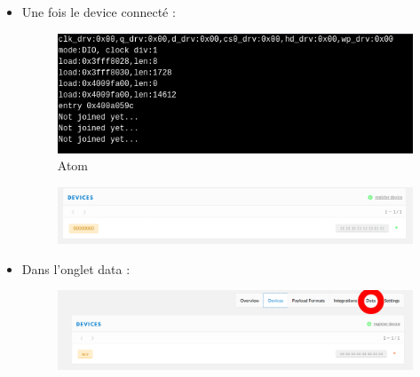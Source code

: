 \documentclass{article}
\begin{document}
    \begin{itemize}
    \item Une fois le device connecté :
    \begin{figure}[H]
\begin{center}
\advance\leftskip-3cm
\advance\rightskip-3cm
\includegraphics[keepaspectratio=true,scale=0.6]{nanogateway_node.png}
\caption{Atom}
\label{visina8}
\end{center}\end{figure}
 
  \begin{figure}[H]
\begin{center}
\advance\leftskip-3cm
\advance\rightskip-3cm
\includegraphics[keepaspectratio=true,scale=0.4]{device_connected.png}
\label{visina8}
\end{center}\end{figure}
  
  
  \item Dans l'onglet data :
  
  \begin{figure}[H]
\begin{center}
\advance\leftskip-3cm
\advance\rightskip-3cm
\includegraphics[keepaspectratio=true,scale=0.4]{data_tab.png}
\label{visina8}
\end{center}\end{figure}
  
  
  

\end{itemize}
\end{document}
